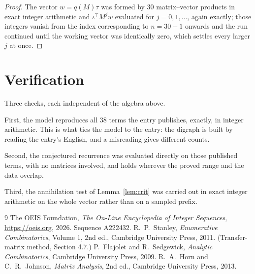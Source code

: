 \documentclass[11pt,a4paper]{article}
\theoremstyle{plain}
\theoremstyle{definition}
\begin{document}
\begin{proof}
The vector $w=q(M)\tau$ was formed by $30$ matrix--vector products in exact integer
arithmetic and $\iota^{\!\top}M^{j}w$ evaluated for $j=0,1,\dots$, again exactly; those
integers vanish from the index corresponding to $n=30+1$ onwards and the run continued
until the working vector was identically zero, which settles every larger $j$ at once.
\end{proof}

\section{Verification}

Three checks, each independent of the algebra above.

First, the model reproduces all $38$ terms the entry publishes, exactly, in integer
arithmetic. This is what ties the model to the entry: the digraph is built by reading the
entry's English, and a misreading gives different counts.

Second, the conjectured recurrence was evaluated directly on those published terms, with no
matrices involved, and holds wherever the proved range and the data overlap.

Third, the annihilation test of Lemma~\ref{lem:crit} was carried out in exact integer
arithmetic on the whole vector rather than on a sampled prefix.

\begin{thebibliography}{9}
 The OEIS Foundation, \emph{The On-Line Encyclopedia of Integer
Sequences}, \url{https://oeis.org}, 2026. Sequence A222432.
 R.~P.~Stanley, \emph{Enumerative Combinatorics}, Volume 1, 2nd ed.,
Cambridge University Press, 2011. (Transfer-matrix method, Section 4.7.)
 P.~Flajolet and R.~Sedgewick, \emph{Analytic Combinatorics}, Cambridge
University Press, 2009.
 R.~A.~Horn and C.~R.~Johnson, \emph{Matrix Analysis}, 2nd ed., Cambridge
University Press, 2013.
\end{thebibliography}
\end{document}
